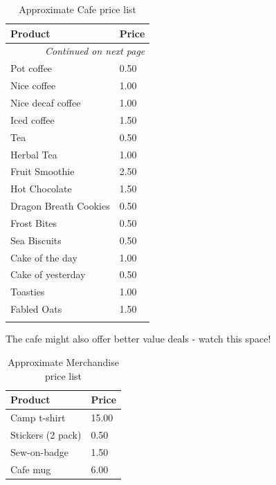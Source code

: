 \documentclass[a4paper, 11pt]{report}
\begin{document}
{\RaggedRight \centering
\begin{longtable}{p{}p{}}
        \textbf{Product} & \textbf{Price}\\
        \hline
        \endhead

        \multicolumn{2}{r}{\footnotesize\itshape Continued on next page}\\
        \endfoot 
        
        \endlastfoot

        Pot coffee & 0.50\\
        Nice coffee & 1.00\\
        Nice decaf coffee & 1.00\\
        Iced coffee & 1.50\\
        \hline
        Tea & 0.50\\
        Herbal Tea & 1.00\\
        \hline
        Fruit Smoothie & 2.50\\
        Hot Chocolate & 1.50\\
        \hline
        Dragon Breath Cookies & 0.50\\
        Frost Bites & 0.50\\
        Sea Biscuits & 0.50\\
        \hline
        Cake of the day & 1.00\\
        Cake of yesterday & 0.50\\
        \hline
        Toasties & 1.00\\
        Fabled Oats & 1.50\\
        \hline
    \caption{Approximate Cafe price list}
\end{longtable}
}%
The cafe might also offer better value deals - watch this space!
\begin{table}[H]
    \centering
    {\RaggedRight
    \begin{tabular}{p{}p{}}
        \textbf{Product} & \textbf{Price}\\
        \hline
        Camp t-shirt & 15.00\\
        \hline
        Stickers (2 pack) & 0.50\\
        Sew-on-badge & 1.50\\
        \hline
        Cafe mug & 6.00\\
        \hline
    \end{tabular}
    }%
    \caption{Approximate Merchandise price list}
\end{table}
\end{document}
